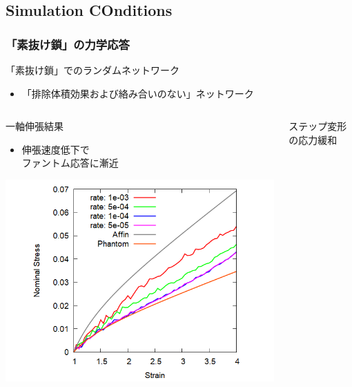 \documentclass[12pt, dvipdfmx]{beamer}
\begin{document}
\subsection{Simulation COnditions}
\begin{frame}
	\frametitle{「素抜け鎖」の力学応答}
		\begin{alertblock}{「素抜け鎖」でのランダムネットワーク}
			\begin{itemize}
				\item \alert{「排除体積効果および絡み合いのない」}ネットワーク
			\end{itemize}
        \end{alertblock}
        \vspace{-3mm}
		\begin{columns}[totalwidth=\linewidth]
				\begin{block}{一軸伸張結果}
					\begin{itemize}
						\item 伸張速度低下で\\\alert{ファントム応答}に漸近
                    \end{itemize}
                    \begin{center}
                        \includegraphics[width=.9\columnwidth]{N48_sunuke.png}
                    \end{center}
				\end{block}
				\begin{exampleblock}{ステップ変形の応力緩和}
                    \begin{itemize}

\end{itemize}
\end{exampleblock}
\end{columns}
\end{frame}
\end{document}
